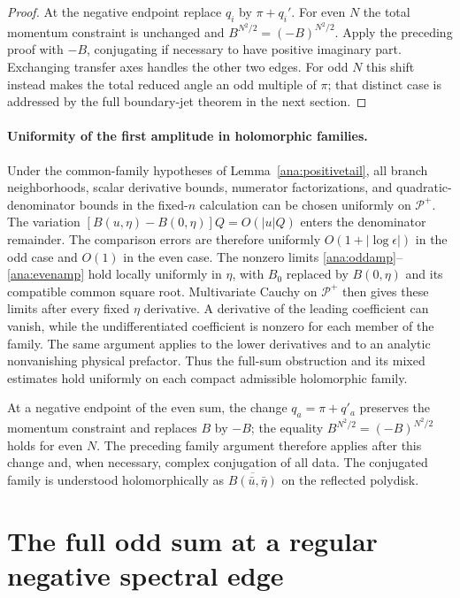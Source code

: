 \documentclass[11pt]{article}
\numberwithin{equation}{section}
\theoremstyle{definition}
\begin{document}
\begin{proof}
At the negative endpoint replace \(q_i\) by \(\pi+q_i'\).
For even \(N\) the total momentum constraint is unchanged and
\(B^{N^2/2}=(-B)^{N^2/2}\). Apply the preceding proof with
\(-B\), conjugating if necessary to have positive imaginary part.
Exchanging transfer axes handles the other two edges.
For odd \(N\) this shift instead makes the total reduced angle
an odd multiple of \(\pi\); that distinct case is addressed by
the full boundary-jet theorem in the next section.
\end{proof}

\paragraph{Uniformity of the first amplitude in holomorphic families.}
Under the common-family hypotheses of Lemma~\ref{ana:positivetail},
all branch neighborhoods, scalar derivative bounds, numerator
factorizations, and quadratic-denominator bounds in the fixed-$n$
calculation can be chosen uniformly on $\mathcal P^+$. The variation
$[B(u,\eta)-B(0,\eta)]Q=O(|u|Q)$ enters the denominator remainder.
The comparison errors are therefore uniformly
$O(1+|\log\epsilon|)$ in the odd case and $O(1)$ in the even
case.  The nonzero limits \eqref{ana:oddamp}--\eqref{ana:evenamp}
hold locally uniformly in $\eta$, with $B_0$ replaced by
$B(0,\eta)$ and its compatible common square root.  Multivariate
Cauchy on $\mathcal P^+$ then gives these limits after every fixed
$\eta$ derivative. A derivative of the leading coefficient can
vanish, while the undifferentiated coefficient is nonzero for each
member of the family. The same argument applies to the lower
derivatives and to an analytic nonvanishing physical prefactor.
Thus the full-sum obstruction and its mixed estimates hold
uniformly on each compact admissible holomorphic family.

At a negative endpoint of the even sum, the change
$q_a=\pi+q'_a$ preserves the momentum constraint and replaces $B$
by $-B$; the equality $B^{N^2/2}=(-B)^{N^2/2}$ holds for even
$N$.  The preceding family argument therefore applies after this
change and, when necessary, complex conjugation of all data.  The
conjugated family is understood holomorphically as
$\overline{B(\bar u,\bar\eta)}$ on the reflected polydisk.


\section{The full odd sum at a regular negative spectral edge}
\label{neg:section}
\end{document}
